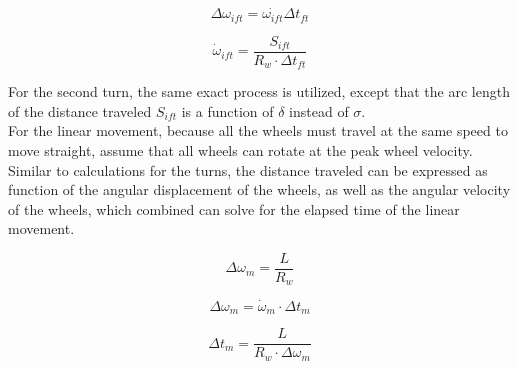 \begin{equation}\label{sample_return_rover:vel_kin:delta_omegai}
	\Delta\omega_{ift} = \dot{\omega_{ift}}\Delta t_{ft}
\end{equation}

\begin{equation}\label{sample_return_rover:vel_kin:omega_doti}
	\dot{\omega}_{ift} = \frac{S_{ift}}{R_{w} \cdot \Delta t_{ft}}
\end{equation}

For the second turn, the same exact process is utilized, except that the arc length of the distance traveled $S_{ift}$ is a function of $\delta$ instead of $\sigma$. \\

For the linear movement, because all the wheels must travel at the same speed to move straight, assume that all wheels can rotate at the peak wheel velocity. Similar to calculations for the turns, the distance traveled can be expressed as function of the angular displacement of the wheels, as well as the angular velocity of the wheels, which combined can solve for the elapsed time of the linear movement.

\begin{equation}\label{sample_return_rover:vel_kin:delta_omegam1}
	\Delta\omega_{m} = \frac{L}{R_{w}}
\end{equation}

\begin{equation}\label{sample_return_rover:vel_kin:delta_omegam2}
	\Delta\omega_{m} = \dot{\omega}_{m} \cdot \Delta t_{m}
\end{equation}

\begin{equation}\label{sample_return_rover:vel_kin:delta_tm}
	\Delta t_{m} = \frac{L}{R_{w} \cdot \Delta\omega_{m}}
\end{equation}
